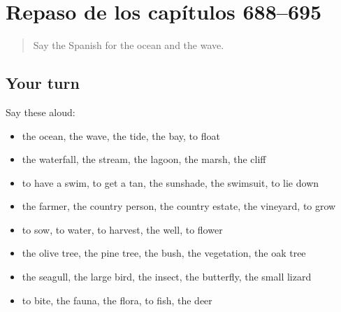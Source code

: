 \section[(dialogue)]{Repaso de los capítulos 688–695}

\label{lesson:ES-R695-repaso-688-695}



\begin{quote}
Say the Spanish for the ocean and the wave.
\end{quote}

\subsection*{Your turn}
Say these aloud:

\begin{itemize}
\raggedright
  \item the ocean, the wave, the tide, the bay, to float
  \item the waterfall, the stream, the lagoon, the marsh, the cliff
  \item to have a swim, to get a tan, the sunshade, the swimsuit, to lie down
  \item the farmer, the country person, the country estate, the vineyard, to grow
  \item to sow, to water, to harvest, the well, to flower
  \item the olive tree, the pine tree, the bush, the vegetation, the oak tree
  \item the seagull, the large bird, the insect, the butterfly, the small lizard
  \item to bite, the fauna, the flora, to fish, the deer
\end{itemize}

